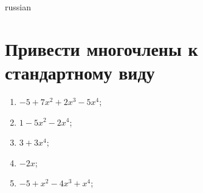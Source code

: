 \documentclass[a4paper]{article}
\begin{document}
\begin{otherlanguage*}{russian}

\section{Привести многочлены к стандартному виду}
\begin{enumerate}
\item $-5 + 7x^2 + 2x^3-5x^4$;
\item $1-5x^2-2x^4$;
\item $3 + 3x^4$;
\item $-2x$;
\item $-5 + x^2-4x^3 + x^4$;
\end{enumerate}
\end{otherlanguage*}
\end{document}
